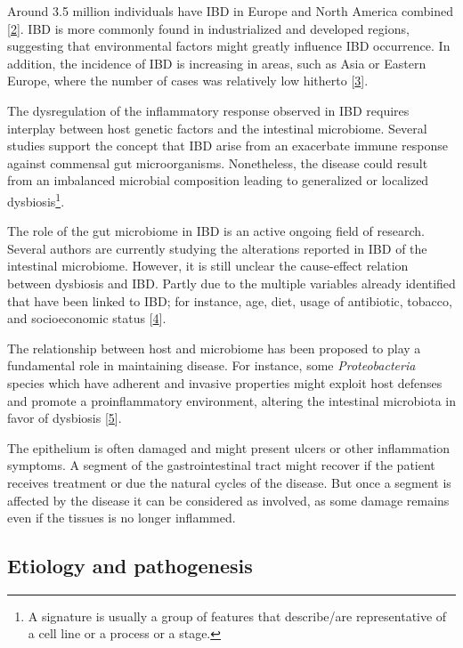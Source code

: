 \documentclass[
  a4paper,
]{book}
\begin{document}
Around 3.5 million individuals have IBD in Europe and North America combined {[}\protect\hyperlink{ref-jairath2020}{2}{]}.
IBD is more commonly found in industrialized and developed regions, suggesting that environmental factors might greatly influence IBD occurrence.
In addition, the incidence of IBD is increasing in areas, such as Asia or Eastern Europe, where the number of cases was relatively low hitherto {[}\protect\hyperlink{ref-burisch2015}{3}{]}.

The dysregulation of the inflammatory response observed in IBD requires interplay between host genetic factors and the intestinal microbiome.
Several studies support the concept that IBD arise from an exacerbate immune response against commensal gut microorganisms.
Nonetheless, the disease could result from an imbalanced microbial composition leading to generalized or localized dysbiosis\footnote{A signature is usually a group of features that describe/are representative of a cell line or a process or a stage.}.

The role of the gut microbiome in IBD is an active ongoing field of research.
Several authors are currently studying the alterations reported in IBD of the intestinal microbiome.
However, it is still unclear the cause-effect relation between dysbiosis and IBD.
Partly due to the multiple variables already identified that have been linked to IBD; for instance, age, diet, usage of antibiotic, tobacco, and socioeconomic status {[}\protect\hyperlink{ref-human_microbiome_project_consortium_framework_2012}{4}{]}.

The relationship between host and microbiome has been proposed to play a fundamental role in maintaining disease.
For instance, some \emph{Proteobacteria} species which have adherent and invasive properties might exploit host defenses and promote a proinflammatory environment, altering the intestinal microbiota in favor of dysbiosis {[}\protect\hyperlink{ref-mukhopadhya2012}{5}{]}.

The epithelium is often damaged and might present ulcers or other inflammation symptoms.
A segment of the gastrointestinal tract might recover if the patient receives treatment or due the natural cycles of the disease.
But once a segment is affected by the disease it can be considered as involved, as some damage remains even if the tissues is no longer inflammed.

\hypertarget{etiology-and-pathogenesis}{%
\subsection{Etiology and pathogenesis}\label{etiology-and-pathogenesis}}
\end{document}
